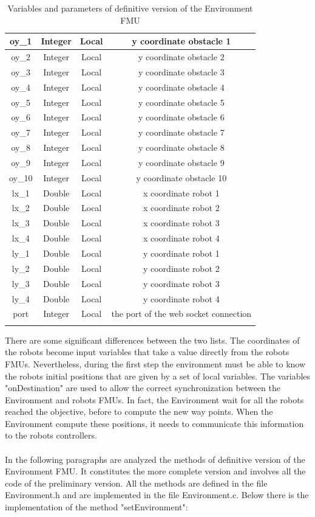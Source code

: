 \documentclass[english]{article}
\begin{document}
\begin{longtable}{|c|c|c|c|}
	oy\_1 & Integer & Local & y coordinate obstacle 1 \\ \hline
	oy\_2 & Integer & Local & y coordinate obstacle 2 \\ \hline
	oy\_3 & Integer & Local & y coordinate obstacle 3 \\ \hline
	oy\_4 & Integer & Local & y coordinate obstacle 4 \\ \hline
	oy\_5 & Integer & Local & y coordinate obstacle 5 \\ \hline
	oy\_6 & Integer & Local & y coordinate obstacle 6 \\ \hline
	oy\_7 & Integer & Local & y coordinate obstacle 7 \\ \hline
	oy\_8 & Integer & Local & y coordinate obstacle 8 \\ \hline
	oy\_9 & Integer & Local & y coordinate obstacle 9 \\ \hline
	oy\_10 & Integer & Local & y coordinate obstacle 10 \\ \hline
	lx\_1 & Double & Local & x coordinate robot 1 \\ \hline
	lx\_2 & Double & Local & x coordinate robot 2 \\ \hline
	lx\_3 & Double & Local & x coordinate robot 3 \\ \hline
	lx\_4 & Double & Local & x coordinate robot 4 \\ \hline
	ly\_1 & Double & Local & y coordinate robot 1 \\ \hline
	ly\_2 & Double & Local & y coordinate robot 2 \\ \hline
	ly\_3 & Double & Local & y coordinate robot 3 \\ \hline
	ly\_4 & Double & Local & y coordinate robot 4 \\ \hline
	port & Integer & Local & the port of the web socket connection \\ \hline
	\caption{Variables and parameters of definitive version of the Environment FMU}
	\label{tab:label2}
\end{longtable}  

\noindent There are some significant differences between the two lists. The coordinates of the robots become input variables that take a value directly from the robots FMUs. Nevertheless, during the first step the environment must be able to know the robots initial positions that are given by a set of local variables. The variables "onDestination" are used to allow the correct synchronization between the Environment and robots FMUs. In fact, the Environment wait for all the robots reached the objective, before to compute the new way points. When the Environment compute these positions, it needs to communicate this information to the robots controllers.\\
\\In the following paragraphs are analyzed the methods of definitive version of the Environment FMU. It constitutes the more complete version and involves all the code of the preliminary version. All the methods are defined in the file Environment.h and are implemented in the file Environment.c. 
Below there is the implementation of the method "setEnvironment":
\end{document}
